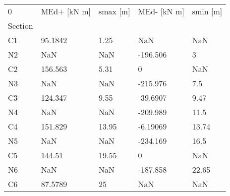 \begin{tabular}{lllll}
\toprule
0 & MEd+ [kN m] & smax [m] & MEd- [kN m] & smin [m] \\
Section &             &          &             &          \\
\midrule
C1      &     95.1842 &     1.25 &         NaN &      NaN \\
N2      &         NaN &      NaN &    -196.506 &        3 \\
C2      &     156.563 &     5.31 &           0 &      NaN \\
N3      &         NaN &      NaN &    -215.976 &      7.5 \\
C3      &     124.347 &     9.55 &    -39.6907 &     9.47 \\
N4      &         NaN &      NaN &    -209.989 &     11.5 \\
C4      &     151.829 &    13.95 &    -6.19069 &    13.74 \\
N5      &         NaN &      NaN &    -234.169 &     16.5 \\
C5      &      144.51 &    19.55 &           0 &      NaN \\
N6      &         NaN &      NaN &    -187.858 &    22.65 \\
C6      &     87.5789 &       25 &         NaN &      NaN \\
\bottomrule
\end{tabular}
